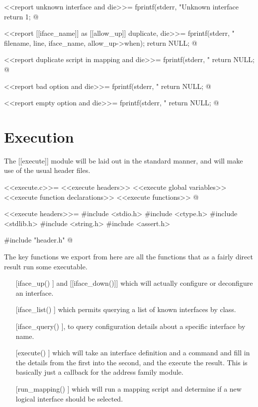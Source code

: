 \documentclass{article}
\begin{document}
<<report unknown interface and die>>=
fprintf(stderr, "Unknown interface %
return 1;
@

<<report [[iface_name]] as [[allow_up]] duplicate, die>>=
fprintf(stderr, "%
	filename, line, iface_name, allow_up->when);
return NULL;
@

<<report duplicate script in mapping and die>>=
fprintf(stderr, "%
return NULL;
@ 

<<report bad option and die>>=
fprintf(stderr, "%
return NULL;
@

<<report empty option and die>>=
fprintf(stderr, "%
return NULL;
@ 

\section{Execution}

The [[execute]] module will be laid out in the standard manner, and
will make use of the usual header files.

<<execute.c>>=
<<execute headers>>
<<execute global variables>>
<<execute function declarations>>
<<execute functions>>
@ 

<<execute headers>>=
#include <stdio.h>
#include <ctype.h>
#include <stdlib.h>
#include <string.h>
#include <assert.h>

#include "header.h"
@

The key functions we export from here are all the functions that as a
fairly direct result run some executable.

\begin{itemize}
	\item [[iface_up()]] and [[iface_down()]] which will actually
	configure or deconfigure an interface.

	\item [[iface_list()]] which permits querying a list of known
	interfaces by class.

	\item [[iface_query()]], to query configuration details about a
	specific interface by name.

	\item [[execute()]] which will take an interface definition and
	a command and fill in the details from the first into the
	second, and the execute the result. This is basically just a
	callback for the address family module.

	\item [[run_mapping()]] which will run a mapping script and
	determine if a new logical interface should be selected.
\end{itemize}
\end{document}
